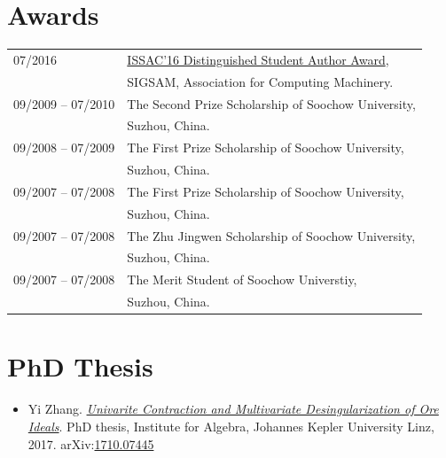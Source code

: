 \documentclass[a4paper,12pt]{article}
\begin{document}
\section*{\Large{Awards}}
\begin{tabular}{@{}p{1.4in}p{4in}}
07/2016               & \href{https://www.sigsam.org/Awards/ISSACAwards.html}{ISSAC'16 Distinguished Student Author Award}, \\
                      & SIGSAM, Association for Computing Machinery. \\
09/2009 -- 07/2010    & The Second Prize Scholarship of Soochow University, \\ 
                      & Suzhou, China.\\
09/2008 -- 07/2009    & The First Prize Scholarship of Soochow University, \\ 
                      & Suzhou, China.\\
09/2007 -- 07/2008    & The First Prize Scholarship of Soochow University, \\ 
                      & Suzhou, China.\\
09/2007 -- 07/2008    & The Zhu Jingwen Scholarship of Soochow University, \\ 
                      & Suzhou, China.\\
09/2007 -- 07/2008    & The Merit Student of Soochow Universtiy, \\ 
                      & Suzhou, China.\\
\end{tabular}


\section*{\Large{PhD Thesis}}
\begin{itemize}
 \item Yi Zhang. \href{https://yzhang1616.github.io/yzhang_PhDthesis_final.pdf}{{\em Univarite 
                Contraction and Multivariate Desingularization of Ore Ideals}}. 
                PhD thesis, Institute for Algebra, Johannes Kepler University Linz, 2017. 
                arXiv:\href{https://arxiv.org/abs/1710.07445}{1710.07445}
\end{itemize}
\end{document}
